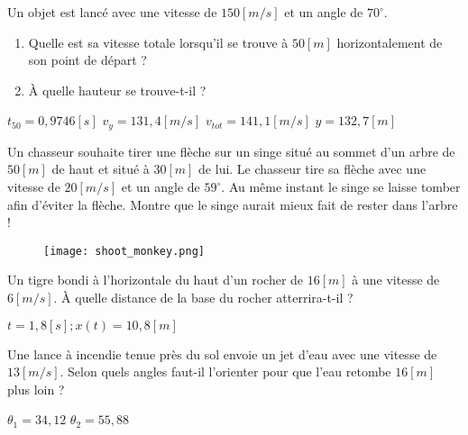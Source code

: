 \begin{exercise}
    Un objet est lancé avec une vitesse de \(150\unit{[m/s]}\) et un angle de \(70^{\circ}\).
    \begin{enumerate}[label=\alph*)]
        \item Quelle est sa vitesse totale lorsqu'il se trouve à \(50[m]\) horizontalement de son point de départ ?
        \item À quelle hauteur se trouve-t-il ?
    \end{enumerate}
\end{exercise}
\begin{solution}
    \(t_{50}=0,9746[s]\)
    \(v_y=131,4\unit{[m/s]}\)
    \(v_{tot}=141,1\unit{[m/s]}\)
    \(y=132,7[m]\)
\end{solution}


\begin{exercise}
    Un chasseur souhaite tirer une flèche sur un singe situé au sommet d'un arbre de \(50[m]\) de haut et situé à \(30[m]\) de lui. Le chasseur tire sa flèche avec une vitesse de \(20\unit{[m/s]}\) et un angle de \(59^{\circ}\). Au même instant le singe se laisse tomber afin d'éviter la flèche. Montre que le singe aurait mieux fait de rester dans l'arbre !
    \begin{figure}[!ht]
        \centering
        \texttt{[image: shoot\_monkey.png]}
    \end{figure}
\end{exercise}


\begin{exercise}
    Un tigre bondi à l'horizontale du haut d'un rocher de \(16[m]\) à une vitesse de \(6\unit{[m/s]}\). À quelle distance de la base du rocher atterrira-t-il ?
\end{exercise}
\begin{solution}
    \(t=1,8[s] ; x(t)=10,8[m]\)
\end{solution}

\begin{exercise}
    Une lance à incendie tenue près du sol envoie un jet d'eau avec une vitesse de \(13\unit{[m/s]}\). Selon quels angles faut-il l'orienter pour que l'eau retombe \(16[m]\) plus loin ?
\end{exercise}
\begin{solution}
    \(\theta _1 = 34,12 \)
    \(\theta _2 = 55,88 \)
\end{solution}

\begin{exercise}
\end{exercise}

